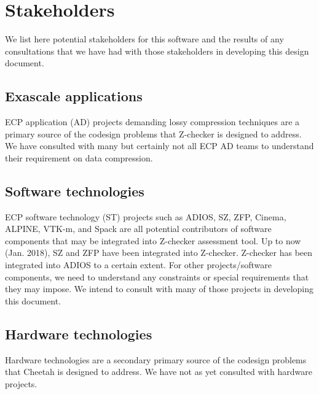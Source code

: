 \section{Stakeholders}

We list here potential stakeholders for this software and the results of any consultations that we have had with those stakeholders in developing this design document.

\subsection{Exascale applications}

ECP application (AD) projects demanding lossy compression techniques are a primary source of the codesign problems that Z-checker is designed to address.
We have consulted with many but certainly not all ECP AD teams to understand their requirement on data compression.

\subsection{Software technologies}

ECP software technology (ST) projects such as ADIOS, SZ, ZFP, Cinema, ALPINE, VTK-m, and Spack
are all potential contributors of software components that may be integrated into Z-checker assessment tool. 
Up to now (Jan. 2018), SZ and ZFP have been integrated into Z-checker. Z-checker has been integrated into ADIOS to a certain extent. 
For other projects/software components, we need to understand any constraints or special requirements that they may impose.
We intend to consult with many of those projects in developing this document.

\subsection{Hardware technologies}

Hardware technologies are a secondary primary source of the codesign problems that Cheetah is designed
to address. We have not as yet consulted with hardware projects.

